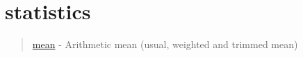 \chapter*{statistics}

\begin{quote}
\noindent
\hyperlink{mean}{mean} - Arithmetic mean (usual, weighted and trimmed mean)\\
\end{quote}

 
